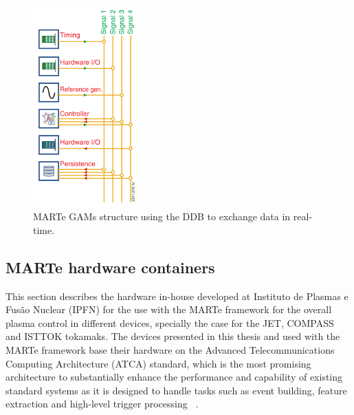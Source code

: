 \begin{figure}[htbp]
	\centering
	\includegraphics[width=0.35\textwidth]{Chp2/GAMs.png}
	\caption{\label{GAMs} MARTe GAMs structure using the DDB to exchange data in real-time.  \cite{MARTe2011}}
	
\end{figure}

\subsection{MARTe hardware containers}

This section describes the  hardware in-house developed at Instituto de Plasmas e Fus\~ao Nuclear (IPFN) for the use with the MARTe framework for the overall plasma control in different devices, specially the case for the JET, COMPASS and ISTTOK tokamaks. The devices presented in this thesis and used with the MARTe framework base their hardware on the  Advanced Telecommunications Computing Architecture (ATCA) standard, which is the most promising architecture to substantially enhance the performance and capability of existing standard systems as it is designed to handle tasks such as event building, feature extraction and high-level trigger processing ~\cite{ATCA2010}.\smallskip

